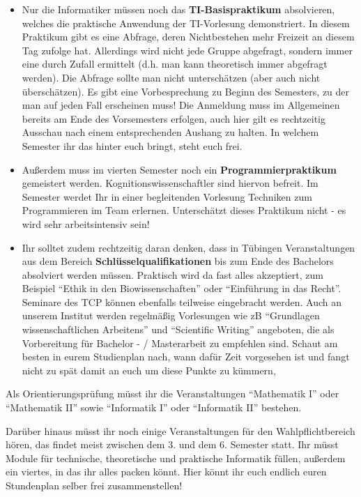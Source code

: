 \begin{itemize}
\item Nur die Informatiker müssen noch das \textbf{TI-Basispraktikum}
     absolvieren, welches die praktische Anwendung der TI-Vorlesung demonstriert.
     In diesem Praktikum gibt es eine Abfrage, deren Nichtbestehen
     mehr Freizeit an diesem Tag zufolge hat.  Allerdings wird nicht jede Gruppe abgefragt,
     sondern immer eine durch Zufall ermittelt (d.h. man kann theoretisch immer abgefragt werden).
     Die Abfrage sollte man nicht unterschätzen (aber auch nicht überschätzen). 
     Es gibt eine Vorbesprechung zu Beginn des Semesters, zu der man auf jeden Fall erscheinen muss!
     Die Anmeldung muss im Allgemeinen bereits am Ende des Vorsemesters erfolgen, auch hier gilt
     es rechtzeitig Ausschau nach einem entsprechenden Aushang zu halten. In welchem Semester ihr
     das hinter euch bringt, steht euch frei.

\item Außerdem muss im vierten Semester noch ein \textbf{Programmierpraktikum} gemeistert werden. Kognitionswissenschaftler sind hiervon befreit. Im Semester werdet Ihr in einer begleitenden Vorlesung Techniken zum Programmieren im Team erlernen. Unterschätzt dieses Praktikum nicht - es wird sehr arbeitsintensiv sein!

\item Ihr solltet zudem rechtzeitig daran denken, dass in Tübingen Veranstaltungen
  aus dem Bereich \textbf{Schlüsselqualifikationen} bis zum Ende des Bachelors absolviert werden müssen. Praktisch wird da fast
  alles akzeptiert, zum Beispiel "`Ethik in den Biowissenschaften"' oder "`Einführung in das Recht"'.  Seminare des TCP können ebenfalls teilweise eingebracht werden.
  Auch an unserem Institut werden regelmäßig Vorlesungen wie zB "`Grundlagen wissenschaftlichen Arbeitens"' und "`Scientific Writing"'  angeboten, die als Vorbereitung für Bachelor -  / Masterarbeit zu empfehlen sind.
  Schaut am besten in eurem Studienplan nach, wann dafür Zeit vorgesehen ist und fangt nicht zu spät damit an euch um diese Punkte zu kümmern, 

\end{itemize}

Als Orientierungsprüfung müsst ihr die Veranstaltungen "`Mathematik I"' oder "`Mathematik II"' sowie "`Informatik I"' oder "`Informatik II"' bestehen.


Darüber hinaus müsst ihr noch einige Veranstaltungen für den Wahlpflichtbereich hören, das findet
meist zwischen dem 3. und dem 6. Semester statt. Ihr müsst Module für technische, theoretische und praktische Informatik füllen, außerdem ein viertes, in das ihr alles packen könnt. Hier könnt ihr
euch endlich euren Stundenplan selber frei zusammenstellen!


